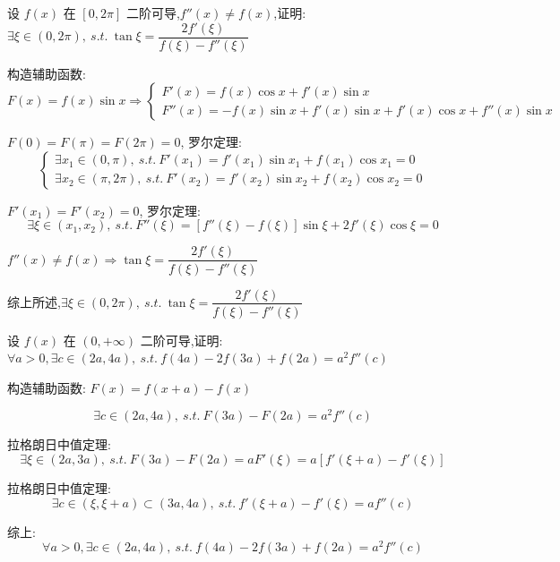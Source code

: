 \begin{proposition}
	设 $f(x)$ 在 $[0,2\pi]$ 二阶可导,$f''(x)\neq f(x)$,证明: $\exists \xi\in(0,2\pi),\ s.t.\ \tan\xi=\dfrac{2f'(\xi)}{f(\xi)-f''(\xi)}$
\end{proposition}
\begin{solution}

	构造辅助函数: 
	$$F(x)=f(x)\sin x\Rightarrow \begin{cases} 
		F'(x) = f(x)\cos x + f'(x)\sin x \\
		F''(x) = -f(x)\sin x +f'(x)\sin x + f'(x)\cos x + f''(x)\sin x
	\end{cases}$$

	$F(0)=F(\pi)=F(2\pi)=0$, 罗尔定理:
	$$\begin{cases}
		\exists x_{1}\in(0,\pi),\ s.t.\ F'(x_{1})=f'(x_{1})\sin x_{1}+f(x_{1})\cos x_{1}=0    \\
		\exists x_{2}\in(\pi,2\pi),\ s.t.\ F'(x_{2})=f'(x_{2})\sin x_{2}+f(x_{2})\cos x_{2}=0 
	\end{cases}$$

	$F'(x_{1}) = F'(x_{2}) = 0$, 罗尔定理:
	$$\exists \xi\in(x_{1},x_{2}),\ s.t.\ F''(\xi)=\left[f''(\xi)-f(\xi)\right]\sin \xi+ 2f'(\xi)\cos\xi = 0$$

	$f''(x)\neq f(x)\Rightarrow \tan\xi = \dfrac{2f'(\xi)}{f(\xi)-f''(\xi)}$

	综上所述,$\exists \xi\in(0,2\pi),\ s.t.\ \tan\xi=\dfrac{2f'(\xi)}{f(\xi)-f''(\xi)}$
\end{solution}

\begin{proposition}
	设 $f(x)$ 在 $(0,+\infty)$ 二阶可导,证明: $\forall a>0,\exists c\in(2a,4a),\ s.t.\ f(4a)-2f(3a)+f(2a)=a^2f''(c)$
\end{proposition}

\begin{solution}

	构造辅助函数: $F(x)=f(x+a)-f(x)$
	
	$$\exists c\in(2a,4a),\ s.t.\ F(3a)-F(2a)=a^2f''(c)$$

	拉格朗日中值定理:
	$$\exists \xi\in(2a,3a),\ s.t.\ F(3a)-F(2a)=aF'(\xi)=a[f'(\xi+a)-f'(\xi)]$$

	拉格朗日中值定理:
	$$\exists c\in(\xi,\xi+a)\subset (3a,4a),\ s.t.\ f'(\xi+a)-f'(\xi)=af''(c)$$

	综上:
	$$\forall a>0,\exists c\in(2a,4a),\ s.t.\ f(4a)-2f(3a)+f(2a)=a^2f''(c)$$
\end{solution}

